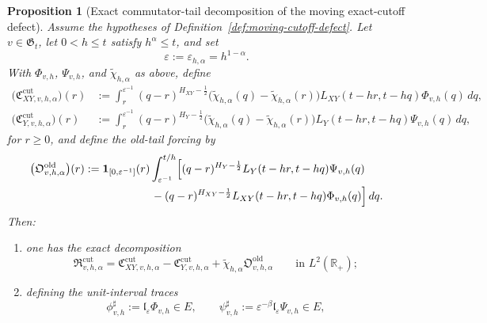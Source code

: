 \documentclass[11pt,a4paper]{amsart}
\theoremstyle{plain}
\newtheorem{proposition}[theorem]{Proposition}
\theoremstyle{definition}
\theoremstyle{remark}
\newcommand{\R}{\mathbb{R}}
\newcommand{\one}{\mathbf 1}
\begin{document}
\begin{proposition}[Exact commutator-tail decomposition of the moving exact-cutoff defect]
\label{prop:moving-cutoff-decomposition}
Assume the hypotheses of Definition~\ref{def:moving-cutoff-defect}. Let \(v\in\mathfrak G_t\),
let \(0<h\le t\) satisfy \(h^\alpha\le t\), and set
\[
\varepsilon:=\varepsilon_{h,\alpha}=h^{1-\alpha}.
\]
With \(\Phi_{v,h}\), \(\Psi_{v,h}\), and \(\widetilde\chi_{h,\alpha}\) as above, define
\begin{align}
\bigl(
\mathfrak C_{XY,v,h,\alpha}^{\mathrm{cut}}
\bigr)(r)
&:=
\int_r^{\varepsilon^{-1}}
(q-r)^{H_{XY}-\frac12}
\bigl(
\widetilde\chi_{h,\alpha}(q)-\widetilde\chi_{h,\alpha}(r)
\bigr)
L_{XY}(t-hr,t-hq)\Phi_{v,h}(q)\,dq,
\label{eq:moving-cutoff-com-XY}\\
\bigl(
\mathfrak C_{Y,v,h,\alpha}^{\mathrm{cut}}
\bigr)(r)
&:=
\int_r^{\varepsilon^{-1}}
(q-r)^{H_Y-\frac12}
\bigl(
\widetilde\chi_{h,\alpha}(q)-\widetilde\chi_{h,\alpha}(r)
\bigr)
L_Y(t-hr,t-hq)\Psi_{v,h}(q)\,dq,
\label{eq:moving-cutoff-com-Y}
\end{align}
for \(r\ge0\), and define the old-tail forcing by
\begin{equation}\label{eq:moving-cutoff-old-tail}
\begin{aligned}
\bigl(
\mathfrak O_{v,h,\alpha}^{\mathrm{old}}
\bigr)(r)
&:=
\one_{[0,\varepsilon^{-1}]}(r)
\int_{\varepsilon^{-1}}^{t/h}
\Bigl[
(q-r)^{H_Y-\frac12}
L_Y(t-hr,t-hq)\Psi_{v,h}(q)
\\
&\qquad\qquad\qquad
-
(q-r)^{H_{XY}-\frac12}
L_{XY}(t-hr,t-hq)\Phi_{v,h}(q)
\Bigr]\,dq.
\end{aligned}
\end{equation}
Then:
\begin{enumerate}[label=(\roman*)]
\item one has the exact decomposition
\begin{equation}\label{eq:moving-cutoff-decomposition}
\mathfrak R_{v,h,\alpha}^{\mathrm{cut}}
=
\mathfrak C_{XY,v,h,\alpha}^{\mathrm{cut}}
-
\mathfrak C_{Y,v,h,\alpha}^{\mathrm{cut}}
+
\widetilde\chi_{h,\alpha}\mathfrak O_{v,h,\alpha}^{\mathrm{old}}
\qquad\text{in }L^2(\R_+);
\end{equation}
\item defining the unit-interval traces
\begin{equation}\label{eq:moving-cutoff-local-traces}
\phi_{v,h}^{\sharp}
:=
\mathfrak l_{\varepsilon}\Phi_{v,h}\in E,
\qquad
\psi_{v,h}^{\sharp}
:=
\varepsilon^{-\beta}\mathfrak l_{\varepsilon}\Psi_{v,h}\in E,
\end{equation}

\end{enumerate}
\end{proposition}
\end{document}
